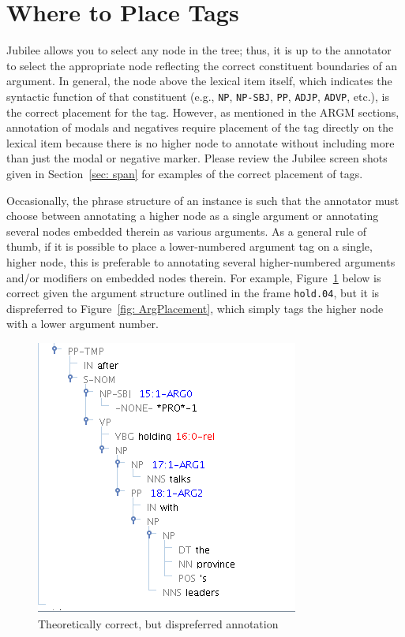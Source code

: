 \documentclass[11pt]{report}
\begin{document}
\section{Where to Place Tags}
Jubilee allows you to select any node in the tree; thus, it is up to the annotator to select the appropriate node reflecting the correct constituent boundaries of an argument.  In general, the node above the lexical item itself, which indicates the syntactic function of that constituent (e.g., \texttt{NP}, \texttt{NP-SBJ}, \texttt{PP}, \texttt{ADJP}, \texttt{ADVP}, etc.), is the correct placement for the tag.  However, as mentioned in the ARGM sections, annotation of modals and negatives require placement of the tag directly on the lexical item because there is no higher node to annotate without including more than just the modal or negative marker.  Please review the Jubilee screen shots given in Section~\ref{sec: span} for examples of the correct placement of tags.  

Occasionally, the phrase structure of an instance is such that the annotator must choose between annotating a higher node as a single argument or annotating several nodes embedded therein as various arguments.  As a general rule of thumb, if it is possible to place a lower-numbered argument tag on a single, higher node, this is preferable to annotating several higher-numbered arguments and/or modifiers on embedded nodes therein.  For example, Figure~\ref{fig: BadArgPlacement} below is correct given the argument structure outlined in the frame \texttt{hold.04}, but it is dispreferred to Figure~\ref{fig: ArgPlacement}, which simply tags the higher node with a lower argument number.

\begin{figure}[htbp]
\centering
\includegraphics[scale=0.4]{img/BadArgPlacement.png}
\caption{Theoretically correct, but dispreferred annotation}
\label{fig: BadArgPlacement}
\end{figure}
\end{document}
